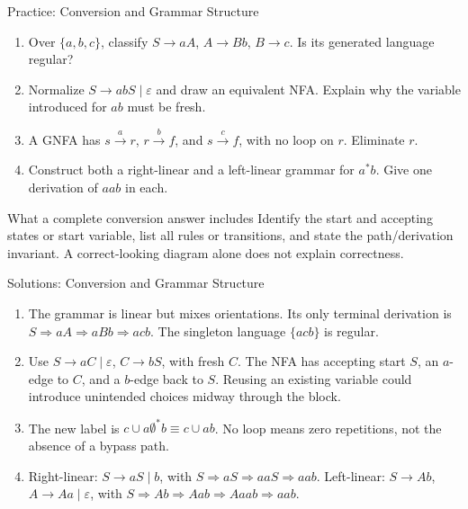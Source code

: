 \documentclass[10pt]{beamer}
\begin{document}
\begin{frame}{Practice: Conversion and Grammar Structure}
  \small
  \begin{enumerate}
    \item Over $\{a,b,c\}$, classify
      $S\to aA$, $A\to Bb$, $B\to c$. Is its generated language regular?
    \item Normalize $S\to abS\mid\varepsilon$ and draw an equivalent NFA.
      Explain why the variable introduced for $ab$ must be fresh.
    \item A GNFA has $s\xrightarrow{a}r$, $r\xrightarrow{b}f$, and
      $s\xrightarrow{c}f$, with no loop on $r$. Eliminate $r$.
    \item Construct both a right-linear and a left-linear grammar for
      $a^*b$. Give one derivation of $aab$ in each.
  \end{enumerate}
  \pause
  \begin{alertblock}{What a complete conversion answer includes}
    Identify the start and accepting states or start variable, list all rules
    or transitions, and state the path/derivation invariant. A correct-looking
    diagram alone does not explain correctness.
  \end{alertblock}
\end{frame}

\begin{frame}{Solutions: Conversion and Grammar Structure}
  \small
  \begin{enumerate}
    \item The grammar is linear but mixes orientations. Its only terminal
      derivation is $S\Rightarrow aA\Rightarrow aBb\Rightarrow acb$.
      The singleton language $\{acb\}$ is regular.
    \pause
    \item Use $S\to aC\mid\varepsilon$, $C\to bS$, with fresh $C$.
      The NFA has accepting start $S$, an $a$-edge to $C$, and a $b$-edge
      back to $S$. Reusing an existing variable could introduce unintended
      choices midway through the block.
    \pause
    \item The new label is $c\cup a\emptyset^*b\equiv c\cup ab$.
      No loop means zero repetitions, not the absence of a bypass path.
    \pause
    \item Right-linear: $S\to aS\mid b$, with
      $S\Rightarrow aS\Rightarrow aaS\Rightarrow aab$.
      Left-linear: $S\to Ab$, $A\to Aa\mid\varepsilon$, with
      $S\Rightarrow Ab\Rightarrow Aab\Rightarrow Aaab\Rightarrow aab$.
  \end{enumerate}
\end{frame}
\end{document}
